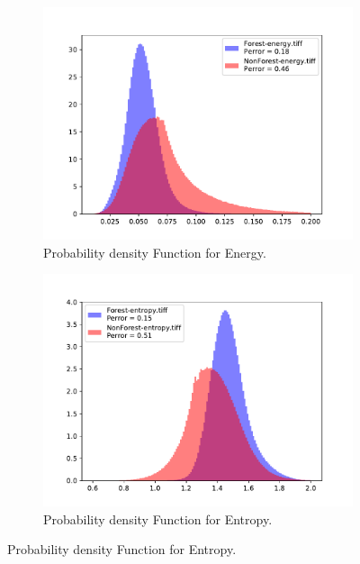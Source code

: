 \begin{figure}[H]
\begin{subfigure}[b]{0.4\linewidth}
    \includegraphics[width=\linewidth]{Chapter5/SENTINEL1/Sigma0/energy_histogram.pdf}
     \caption{Probability density Function for Energy.}
  \end{subfigure}
  \centering
  \begin{subfigure}[b]{0.4\linewidth}
    \includegraphics[width=\linewidth]{Chapter5/SENTINEL1/Sigma0/entropy_histogram.pdf}
     \caption{Probability density Function for Entropy.}
  \end{subfigure}
  \centering
\end{figure}

